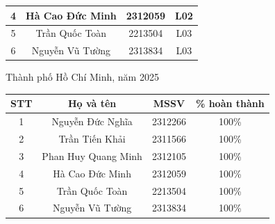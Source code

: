 \documentclass[a4paper]{article}
\renewcommand{\arraystretch}{1.5}\renewcommand{\arraystretch}{1.4}
\begin{document}
\begin{titlepage}
\begin{center}
\begin{tabular}{|c|c|c|c|}
\hline
{4} & {Hà Cao Đức Minh} & {2312059} & {L02} \\

\hline
{5} & {Trần Quốc Toàn} & {2213504} & {L03} \\

\hline
{6} & {Nguyễn Vũ Tường} & {2313834} & {L03} \\
\hline

\end{tabular}

\vfill
Thành phố Hồ Chí Minh, năm 2025

\end{center}
\end{titlepage}

\pagebreak
\tableofcontents
\pagebreak


\begin{center}
\begin{table}[H]
\centering
\renewcommand{\arraystretch}{1.5}
\begin{tabular}{|c|c|c|c|}
\hline
\textbf{STT} & \textbf{Họ và tên} & \textbf{MSSV} & \textbf{\% hoàn thành}\\
\hline 
\multirow{1}{*}{1} & \multirow{1}{*}{Nguyễn Đức Nghĩa} & \multirow{1}{*}{2312266} & \multirow{1}{*}{100\%}\\
\hline 
\multirow{1}{*}{2} & \multirow{1}{*}{Trần Tiến Khải} & \multirow{1}{*}{2311566} & \multirow{1}{*}{100\%}\\
\hline
\multirow{1}{*}{3} & \multirow{1}{*}{Phan Huy Quang Minh} & \multirow{1}{*}{2312105} & \multirow{1}{*}{100\%}\\
\hline
\multirow{1}{*}{4} & \multirow{1}{*}{Hà Cao Đức Minh} & \multirow{1}{*}{2312059} & \multirow{1}{*}{100\%}\\
\hline
\multirow{1}{*}{5} & \multirow{1}{*}{Trần Quốc Toàn} & \multirow{1}{*}{2213504} & \multirow{1}{*}{100\%}\\
\hline
\multirow{1}{*}{6} & \multirow{1}{*}{Nguyễn Vũ Tường} & \multirow{1}{*}{2313834} & \multirow{1}{*}{100\%}\\
\hline

\end{tabular}
\end{table}
\end{center}











% 

% 
% 
\end{document}
